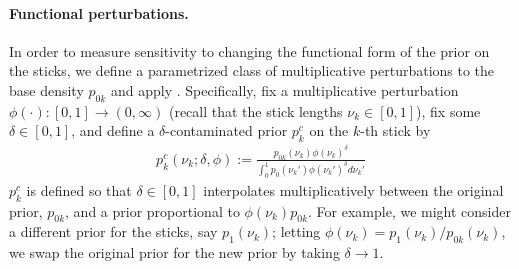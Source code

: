 

\paragraph{Functional perturbations.}
%
In order to measure sensitivity to changing the functional form of the prior on
the sticks, we define a parametrized class of multiplicative perturbations to
the base density $p_{0k}$ and apply .
Specifically, fix a multiplicative perturbation $\phi(\cdot): [0, 1] \rightarrow
(0, \infty)$  (recall that the stick lengths $\nu_k\in[0, 1]$), fix
some $\delta\in[0, 1]$, and define
a $\delta$-contaminated prior $p^c_{k}$ on the $k$-th stick by
%
\begin{align}
\label{eq:expon_perturb}
	p^c_{k}(\nu_k ; \delta, \phi) :=
  \frac{p_{0k}(\nu_k)\phi(\nu_k)^\delta}
       {\int_0^1 p_0(\nu_k')\phi(\nu_k')^\delta d\nu_k'}
\end{align}
%
$p^c_{k}$ is defined so that $\delta\in[0, 1]$ interpolates multiplicatively
between the original prior, $p_{0k}$, and a prior proportional to
$\phi(\nu_k)p_{0k}$. For example, we might consider a different prior for the
sticks, say $p_1(\nu_k)$; letting $\phi(\nu_k) = p_1(\nu_k) / p_{0k}(\nu_k)$, we
swap the original prior for the new prior by taking $\delta \rightarrow 1$.

